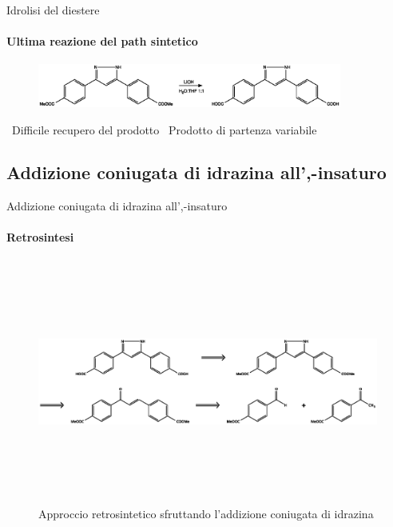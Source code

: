 \documentclass[aspectration=169]{beamer}
\newcommand{\B}{\textcolor{maincolor}{\textbullet}}
\begin{document}
\begin{frame}{Idrolisi del diestere}
	\centering
	\framesubtitle{Ultima reazione del path sintetico}
	\begin{figure}[h!]
		\centering
		\includegraphics[width=10cm,keepaspectratio]{illustration/idrolisi.eps}
	\end{figure}
	\vspace{0.5cm}
	\B \ Difficile recupero del prodotto \hspace{0.6cm} \B \ Prodotto di partenza variabile
\end{frame}

\subsection{Addizione coniugata di idrazina all'\textalpha,\textbeta -insaturo}


\begin{frame}{Addizione coniugata di idrazina all'\textalpha,\textbeta -insaturo}
	\framesubtitle{Retrosintesi}
	\begin{figure}[h!]
		\centering
		\includegraphics[width=13cm,height=8cm,keepaspectratio]{../Structures/pyrazole-retro-alt.eps}
		\caption{Approccio retrosintetico sfruttando l'addizione coniugata di idrazina}
	\end{figure}
\end{frame}
\end{document}
